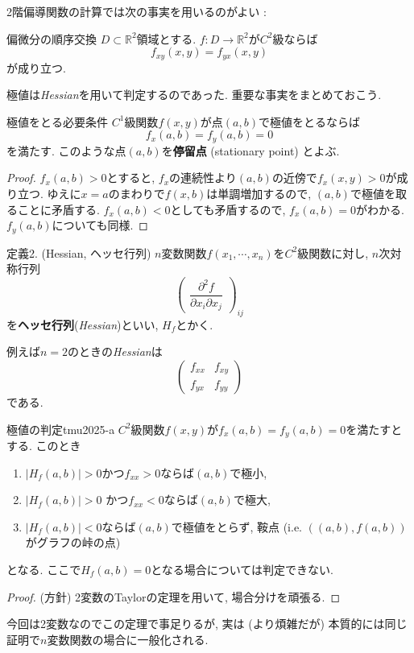 \documentclass[titlepage]{jsarticle}
\numberwithin{equation}{section}
\newcommand{\R}{\mathbb{R}}%
\begin{document}
2階偏導関数の計算では次の事実を用いるのがよい :
\begin{thm}{偏微分の順序交換}{}
$D \subset \R^2$領域とする. $f : D \to \R^2$が$C^2$級ならば
\[
f_{xy}(x, y) = f_{yx}(x, y)
\]
が成り立つ.
\end{thm}
極値は\textit{Hessian}を用いて判定するのであった. 重要な事実をまとめておこう.
\begin{lem}{極値をとる必要条件}{}
$C^1$級関数$f(x, y)$が点$(a, b)$で極値をとるならば
\[
f_x(a,b) = f_y(a, b) = 0
\]
を満たす. このような点$(a, b)$を\textbf{停留点} (stationary point) とよぶ. 
\end{lem}
\begin{proof}
$f_x(a,b) > 0$とすると, $f_x$の連続性より$(a,b)$の近傍で$f_x(x, y)>0$が成り立つ. ゆえに$x =a$のまわりで$f(x, b)$は単調増加するので, $(a,b)$で極値を取ることに矛盾する. $f_x(a,b) < 0$としても矛盾するので, $f_x(a,b) = 0$がわかる. $f_y (a, b)$についても同様.
\end{proof}
\begin{dfn}{定義2. (Hessian, ヘッセ行列)}{}
$n$変数関数$f(x_1, \cdots, x_n)$を$C^2$級関数に対し, $n$次対称行列
\[
\begin{pmatrix}
\dfrac{\partial^2 f}{\partial x_i \partial x_j}
\end{pmatrix}
_{ij}
\]
を\textbf{ヘッセ行列}(\textit{Hessian})といい, $H_f$とかく.
\end{dfn}
例えば$n=2$のときの\textit{Hessian}は
\[
\begin{pmatrix}
f_{xx} & f_{xy}\\
f_{yx} & f_{yy}
\end{pmatrix}
\]
である. 
\begin{thm}{極値の判定}{tmu2025-a}
$C^2$級関数$f(x, y)$が$f_x(a,b) = f_y(a,b) = 0$を満たすとする. このとき
\begin{enumerate}
\item[(1)] $|H_f (a, b)| > 0$かつ$f_{xx} > 0$ならば$(a, b)$で極小,
\item[(2)] $|H_f (a, b)| > 0$ かつ$f_{xx}< 0$ならば$(a, b)$で極大,
\item[(3)] $|H_f (a, b)| < 0$ならば$(a ,b)$で極値をとらず, 鞍点 (i.e. $\left((a, b), f(a,b)\right)$がグラフの峠の点)  
\end{enumerate} 
となる. ここで$H_f(a, b) = 0$となる場合については判定できない.
\end{thm}
\begin{proof}
(方針) 2変数のTaylorの定理を用いて, 場合分けを頑張る.
\end{proof}
今回は2変数なのでこの定理で事足りるが, 実は (より煩雑だが) 本質的には同じ証明で$n$変数関数の場合に一般化される.
\end{document}
